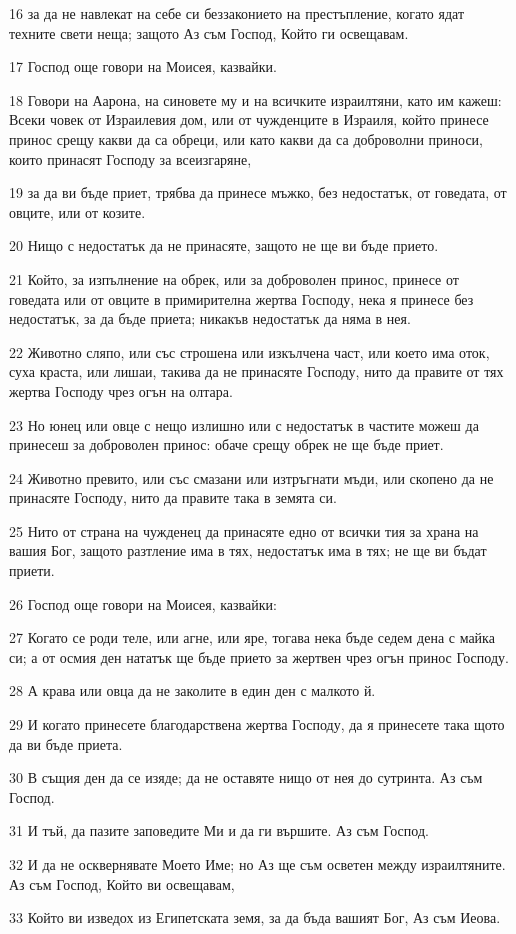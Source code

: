 \par 16 за да не навлекат на себе си беззаконието на престъпление, когато ядат техните свети неща; защото Аз съм Господ, Който ги освещавам.
\par 17 Господ още говори на Моисея, казвайки.
\par 18 Говори на Аарона, на синовете му и на всичките израилтяни, като им кажеш: Всеки човек от Израилевия дом, или от чужденците в Израиля, който принесе принос срещу какви да са обреци, или като какви да са доброволни приноси, които принасят Господу за всеизгаряне,
\par 19 за да ви бъде приет, трябва да принесе мъжко, без недостатък, от говедата, от овците, или от козите.
\par 20 Нищо с недостатък да не принасяте, защото не ще ви бъде прието.
\par 21 Който, за изпълнение на обрек, или за доброволен принос, принесе от говедата или от овците в примирителна жертва Господу, нека я принесе без недостатък, за да бъде приета; никакъв недостатък да няма в нея.
\par 22 Животно сляпо, или със строшена или изкълчена част, или което има оток, суха краста, или лишаи, такива да не принасяте Господу, нито да правите от тях жертва Господу чрез огън на олтара.
\par 23 Но юнец или овце с нещо излишно или с недостатък в частите можеш да принесеш за доброволен принос: обаче срещу обрек не ще бъде приет.
\par 24 Животно превито, или със смазани или изтръгнати мъди, или скопено да не принасяте Господу, нито да правите така в земята си.
\par 25 Нито от страна на чужденец да принасяте едно от всички тия за храна на вашия Бог, защото разтление има в тях, недостатък има в тях; не ще ви бъдат приети.
\par 26 Господ още говори на Моисея, казвайки:
\par 27 Когато се роди теле, или агне, или яре, тогава нека бъде седем дена с майка си; а от осмия ден нататък ще бъде прието за жертвен чрез огън принос Господу.
\par 28 А крава или овца да не заколите в един ден с малкото й.
\par 29 И когато принесете благодарствена жертва Господу, да я принесете така щото да ви бъде приета.
\par 30 В същия ден да се изяде; да не оставяте нищо от нея до сутринта. Аз съм Господ.
\par 31 И тъй, да пазите заповедите Ми и да ги вършите. Аз съм Господ.
\par 32 И да не осквернявате Моето Име; но Аз ще съм осветен между израилтяните. Аз съм Господ, Който ви освещавам,
\par 33 Който ви изведох из Египетската земя, за да бъда вашият Бог, Аз съм Иеова.


